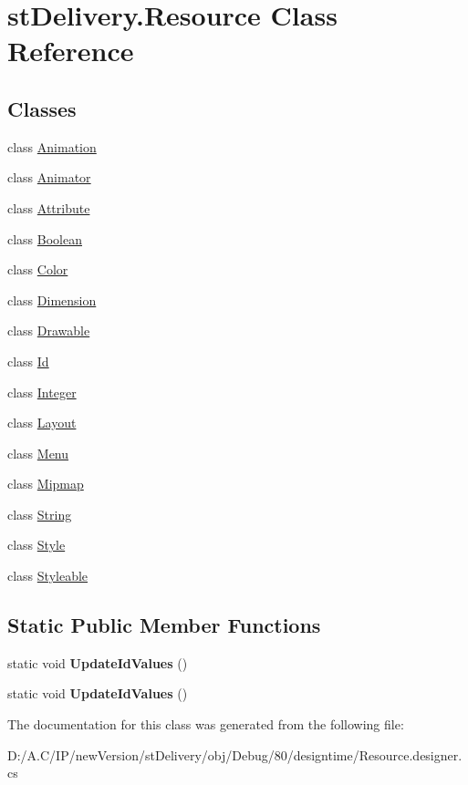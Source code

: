 \hypertarget{classst_delivery_1_1_resource}{}\section{st\+Delivery.\+Resource Class Reference}
\label{classst_delivery_1_1_resource}
\subsection*{Classes}
\begin{DoxyCompactItemize}
\item 
class \hyperlink{classst_delivery_1_1_resource_1_1_animation}{Animation}
\item 
class \hyperlink{classst_delivery_1_1_resource_1_1_animator}{Animator}
\item 
class \hyperlink{classst_delivery_1_1_resource_1_1_attribute}{Attribute}
\item 
class \hyperlink{classst_delivery_1_1_resource_1_1_boolean}{Boolean}
\item 
class \hyperlink{classst_delivery_1_1_resource_1_1_color}{Color}
\item 
class \hyperlink{classst_delivery_1_1_resource_1_1_dimension}{Dimension}
\item 
class \hyperlink{classst_delivery_1_1_resource_1_1_drawable}{Drawable}
\item 
class \hyperlink{classst_delivery_1_1_resource_1_1_id}{Id}
\item 
class \hyperlink{classst_delivery_1_1_resource_1_1_integer}{Integer}
\item 
class \hyperlink{classst_delivery_1_1_resource_1_1_layout}{Layout}
\item 
class \hyperlink{classst_delivery_1_1_resource_1_1_menu}{Menu}
\item 
class \hyperlink{classst_delivery_1_1_resource_1_1_mipmap}{Mipmap}
\item 
class \hyperlink{classst_delivery_1_1_resource_1_1_string}{String}
\item 
class \hyperlink{classst_delivery_1_1_resource_1_1_style}{Style}
\item 
class \hyperlink{classst_delivery_1_1_resource_1_1_styleable}{Styleable}
\end{DoxyCompactItemize}
\subsection*{Static Public Member Functions}
\begin{DoxyCompactItemize}
\item 
\mbox{\label{classst_delivery_1_1_resource_a0b60b68a365faf1472e6f4b727c40aae}} 
static void {\bfseries Update\+Id\+Values} ()
\item 
\mbox{\label{classst_delivery_1_1_resource_a0b60b68a365faf1472e6f4b727c40aae}} 
static void {\bfseries Update\+Id\+Values} ()
\end{DoxyCompactItemize}


The documentation for this class was generated from the following file\+:\begin{DoxyCompactItemize}
\item 
D\+:/\+A.\+C/\+I\+P/new\+Version/st\+Delivery/obj/\+Debug/80/designtime/Resource.\+designer.\+cs\end{DoxyCompactItemize}
